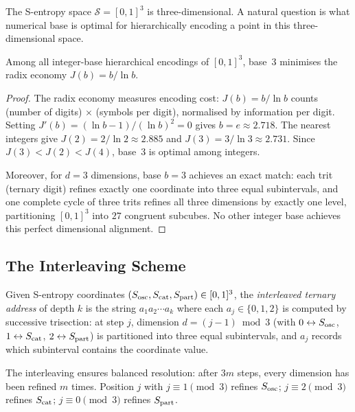 The S-entropy space $\mathcal{S} = [0,1]^3$ is three-dimensional.  A natural
question is what numerical base is optimal for hierarchically encoding a point
in this three-dimensional space.

\begin{theorem}
\label{thm:ch23-ternary}
Among all integer-base hierarchical encodings of $[0,1]^3$, base~3 minimises
the radix economy $J(b) = b / \ln b$.
\end{theorem}

\begin{proof}
The radix economy measures encoding cost: $J(b) = b/\ln b$ counts
(number of digits) $\times$ (symbols per digit), normalised by information
per digit.  Setting $J'(b) = (\ln b - 1)/(\ln b)^2 = 0$ gives $b = e \approx
2.718$.  The nearest integers give $J(2) = 2/\ln 2 \approx 2.885$ and
$J(3) = 3/\ln 3 \approx 2.731$.  Since $J(3) < J(2) < J(4)$, base~3 is
optimal among integers.

Moreover, for $d = 3$ dimensions, base $b = 3$ achieves an exact match:
each trit (ternary digit) refines exactly one coordinate into three equal
subintervals, and one complete cycle of three trits refines all three
dimensions by exactly one level, partitioning $[0,1]^3$ into $27$ congruent
subcubes.  No other integer base achieves this perfect dimensional alignment.
\end{proof}

\subsection{The Interleaving Scheme}
\label{sec:ch23-interleave}

\begin{definition}
\label{def:ch23-address}
Given S-entropy coordinates $(S_{\mathrm{osc}}, S_{\mathrm{cat}}, S_{\mathrm{part}}) \in [0,1]^3$, the
\emph{interleaved ternary address} of depth $k$ is the string $a_1 a_2
\cdots a_k$ where each $a_j \in \{0, 1, 2\}$ is computed by successive
trisection: at step $j$, dimension $d = (j-1) \bmod 3$ (with $0 \leftrightarrow
S_{\mathrm{osc}}$, $1 \leftrightarrow S_{\mathrm{cat}}$, $2 \leftrightarrow S_{\mathrm{part}}$) is partitioned into
three equal subintervals, and $a_j$ records which subinterval contains the
coordinate value.
\end{definition}

The interleaving ensures balanced resolution: after $3m$ steps, every
dimension has been refined $m$ times.  Position $j$ with $j \equiv 1 \pmod 3$
refines $S_{\mathrm{osc}}$; $j \equiv 2 \pmod 3$ refines $S_{\mathrm{cat}}$; $j \equiv 0 \pmod 3$
refines $S_{\mathrm{part}}$.

